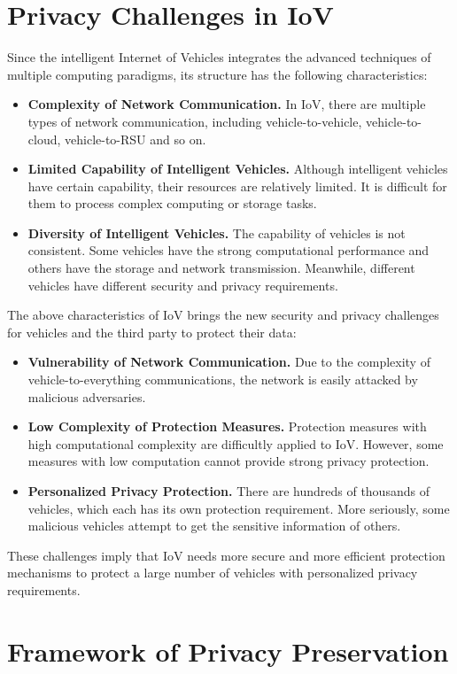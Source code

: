 \documentclass[journal,transmag,11pt]{IEEEtran}
\begin{document}
\section{Privacy Challenges in IoV}
Since the intelligent Internet of Vehicles integrates the advanced techniques of multiple computing paradigms, its structure has the following characteristics:
\begin{itemize}
	\item \textbf{Complexity of Network Communication.} In IoV, there are multiple types of network communication, including vehicle-to-vehicle, vehicle-to-cloud, vehicle-to-RSU and so on. 
	\item \textbf{Limited Capability of Intelligent Vehicles.} Although intelligent vehicles have certain capability, their resources are relatively limited. It is difficult for them to process complex computing or storage tasks.  
	\item \textbf{Diversity of Intelligent Vehicles.} The capability of vehicles is not consistent. Some vehicles have the strong computational performance and others have the storage and network transmission. Meanwhile, different vehicles have different security and privacy requirements.  
\end{itemize}

The above characteristics of IoV brings the new security and privacy challenges for vehicles and the third party to protect their data: 
\begin{itemize}
	\item \textbf{Vulnerability of Network Communication.} Due to the complexity of vehicle-to-everything communications, the network is easily attacked by malicious adversaries.
	\item \textbf{Low Complexity of Protection Measures.} Protection measures with high computational complexity are difficultly applied to IoV. However, some measures with low computation cannot provide strong privacy protection.
	\item \textbf{Personalized Privacy Protection.} There are hundreds of thousands of vehicles, which each has its own protection requirement. More seriously, some malicious vehicles attempt to get the sensitive information of others.
\end{itemize}

These challenges imply that IoV needs more secure and more efficient protection mechanisms to protect a large number of vehicles with personalized privacy requirements.

\section{Framework of Privacy Preservation}
\end{document}
